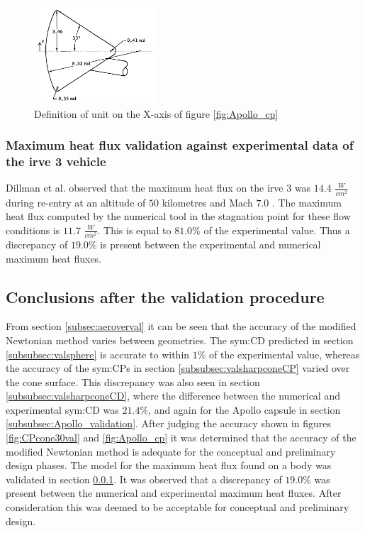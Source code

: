 \begin{figure}[h]
	\centering
	\includegraphics[width=0.4\textwidth]{./Figure/Apollo_model}
	\caption{Definition of unit on the X-axis of figure \ref{fig:Apollo_cp} \cite{Bertin1966}}
	\label{fig:Apollo_y}
\end{figure}

\subsubsection{Maximum heat flux validation against experimental data of the \gls{irve} 3 vehicle}
\label{subsubsec:heatvalidation}
Dillman et al. observed that the maximum heat flux on the \acrfull{irve} 3 was $14.4$ $\frac{W}{cm^{2}}$ during re-entry at an altitude of $50$ kilometres and Mach $7.0$ \cite{Dillman2012}. The maximum heat flux computed by the numerical tool in the stagnation point for these flow conditions is $11.7$ $\frac{W}{cm^{2}}$. This is equal to $81.0\%$ of the experimental value. Thus a discrepancy of $19.0\%$ is present between the experimental and numerical maximum heat fluxes.

\subsection{Conclusions after the validation procedure}
\label{subsec:validconclusions}
From section \ref{subsec:aeroverval} it can be seen that the accuracy of the modified Newtonian method varies between geometries. The \gls{sym:CD} predicted in section \ref{subsubsec:valsphere} is accurate to within $1\%$ of the experimental value, whereas the accuracy of the \glspl{sym:CP} in section \ref{subsubsec:valsharpconeCP} varied over the cone surface. This discrepancy was also seen in section \ref{subsubsec:valsharpconeCD}, where the difference between the numerical and experimental \gls{sym:CD} was $21.4\%$, and again for the Apollo capsule in section \ref{subsubsec:Apollo_validation}. After judging the accuracy shown in figures \ref{fig:CPcone30val} and \ref{fig:Apollo_cp} it was determined that the accuracy of the modified Newtonian method is adequate for the conceptual and preliminary design phases.
The model for the maximum heat flux found on a body was validated in section \ref{subsubsec:heatvalidation}. It was observed that a discrepancy of $19.0\%$ was present between the numerical and experimental maximum heat fluxes. After consideration this was deemed to be acceptable for conceptual and preliminary design.

